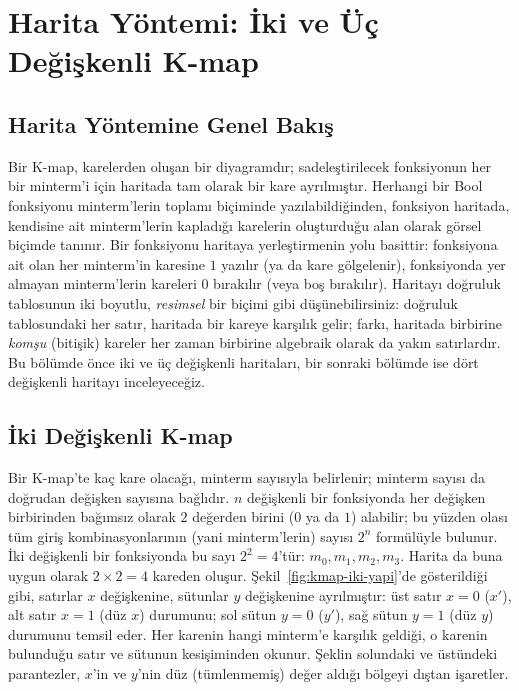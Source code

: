 \section{Harita Yöntemi: İki ve Üç Değişkenli K-map}
\label{sec:kmap-yontemi}

\subsection{Harita Yöntemine Genel Bakış}
\label{sec:kmap-genel-bakis}

Bir K-map, karelerden oluşan bir diyagramdır; sadeleştirilecek fonksiyonun her bir
minterm'i için haritada tam olarak bir kare ayrılmıştır. Herhangi bir Bool fonksiyonu
minterm'lerin toplamı biçiminde yazılabildiğinden, fonksiyon haritada, kendisine ait
minterm'lerin kapladığı karelerin oluşturduğu alan olarak görsel biçimde tanınır. Bir
fonksiyonu haritaya yerleştirmenin yolu basittir: fonksiyona ait olan her minterm'in
karesine $1$ yazılır (ya da kare gölgelenir), fonksiyonda yer almayan minterm'lerin
kareleri $0$ bırakılır (veya boş bırakılır). Haritayı doğruluk tablosunun iki boyutlu,
\emph{resimsel} bir biçimi gibi düşünebilirsiniz: doğruluk tablosundaki her satır, haritada
bir kareye karşılık gelir; farkı, haritada birbirine \emph{komşu} (bitişik) kareler her
zaman birbirine algebraik olarak da yakın satırlardır. Bu bölümde önce iki ve üç değişkenli
haritaları, bir sonraki bölümde ise dört değişkenli haritayı inceleyeceğiz.

\subsection{İki Değişkenli K-map}
\label{sec:kmap-iki-degiskenli}

Bir K-map'te kaç kare olacağı, minterm sayısıyla belirlenir; minterm sayısı da doğrudan
değişken sayısına bağlıdır. $n$ değişkenli bir fonksiyonda her değişken birbirinden
bağımsız olarak $2$ değerden birini ($0$ ya da $1$) alabilir; bu yüzden olası tüm
giriş kombinasyonlarının (yani minterm'lerin) sayısı $2^n$ formülüyle bulunur. İki
değişkenli bir fonksiyonda bu sayı $2^2=4$'tür: $m_0,m_1,m_2,m_3$. Harita da buna uygun
olarak $2\times2=4$ kareden oluşur. Şekil~\ref{fig:kmap-iki-yapi}'de gösterildiği gibi,
satırlar $x$ değişkenine, sütunlar $y$ değişkenine ayrılmıştır: üst satır $x=0$ ($x'$), alt
satır $x=1$ (düz $x$) durumunu; sol sütun $y=0$ ($y'$), sağ sütun $y=1$ (düz $y$) durumunu
temsil eder. Her karenin hangi minterm'e karşılık geldiği, o karenin bulunduğu satır ve
sütunun kesişiminden okunur. Şeklin solundaki ve üstündeki parantezler, $x$'in ve $y$'nin
düz (tümlenmemiş) değer aldığı bölgeyi dıştan işaretler.

